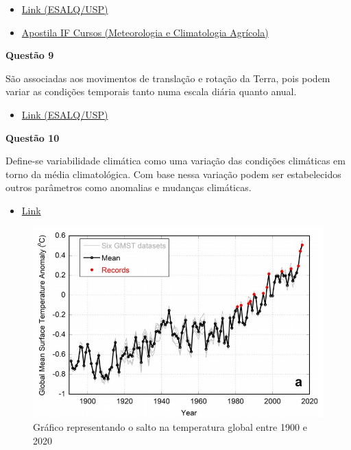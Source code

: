 \documentclass[a4paper, 12pt]{article}
\newcommand{\qs}[1]{\noindent\textbf{Questão #1}}
\begin{document}
		\begin{itemize}
			\item\href{http://www.leb.esalq.usp.br/leb/aulas/lce306/Aula2_2012.pdf}{Link (ESALQ/USP)}
			\item\href{http://www.ifcursos.com.br/sistema/admin/arquivos/09-11-24-ap0stiladefen0men0smete0r0l0gic0s.pdf}{Apostila IF Cursos (Meteorologia e Climatologia Agrícola)}
		\end{itemize}
		
		\qs{9}
	
		\hspace{.2cm}São associadas aos movimentos de translação e rotação da Terra, pois podem variar as condições temporais tanto numa escala diária quanto anual.
		
		\begin{itemize}
			\item\href{http://www.leb.esalq.usp.br/leb/aulas/lce306/Aula2_2012.pdf}{Link (ESALQ/USP)}
		\end{itemize}
	
		\qs{10}
		
		\hspace{.2cm}Define-se variabilidade climática como uma variação das condições climáticas em torno da média climatológica. Com base nessa variação podem ser estabelecidos outros parâmetros como anomalias e mudanças climáticas.
		
		\begin{itemize}
			\item\href{https://files.cercomp.ufg.br/weby/up/68/o/variabilidade__anomalia_e_mudan__as_clim__ticas.pdf}{Link}
		\end{itemize}
		
		\vspace{-1.5cm}
		\begin{figure}[!h]
			\centering
			\includegraphics[scale=.6]{images/graphic.jpg}
			\caption{Gráfico representando o salto na temperatura global entre 1900 e 2020}
		\end{figure}
\end{document}
